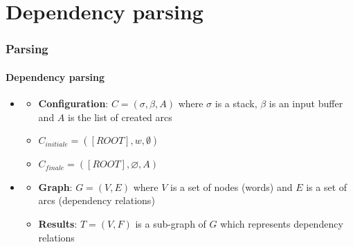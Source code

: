 \documentclass[xcolor=table]{beamer}
\begin{document}
\section{Dependency parsing}

\begin{frame}
\frametitle{Parsing}
\framesubtitle{Dependency parsing}

\begin{minipage}{.6\textwidth}
\begin{itemize}
	\item {} 
	\begin{itemize}
		\item \textbf{Configuration}:  $C = (\sigma, \beta, A)$ where $\sigma$ is a stack, $\beta$ is an input buffer and $A$ is the list of created arcs
		\item $C_{initiale} = ([ROOT], w, \emptyset)$
		\item $C_{finale} = ([ROOT], \varnothing, A)$
	\end{itemize}
\end{itemize}
\end{minipage}
\begin{minipage}{.38\textwidth}
\end{minipage}

%
\vfill

\begin{minipage}{.6\textwidth}
	\begin{itemize}
		\item {}
		\begin{itemize}
			\item \textbf{Graph}: $G = (V, E)$ where $V$ is a set of nodes (words) and $E$ is a set of arcs (dependency relations)
			\item \textbf{Results}: $T = (V, F)$ is a sub-graph of $G$ which represents dependency relations
		\end{itemize}
	\end{itemize}
\end{minipage}
\begin{minipage}{.38\textwidth}
\end{minipage}

\end{frame}
\end{document}
